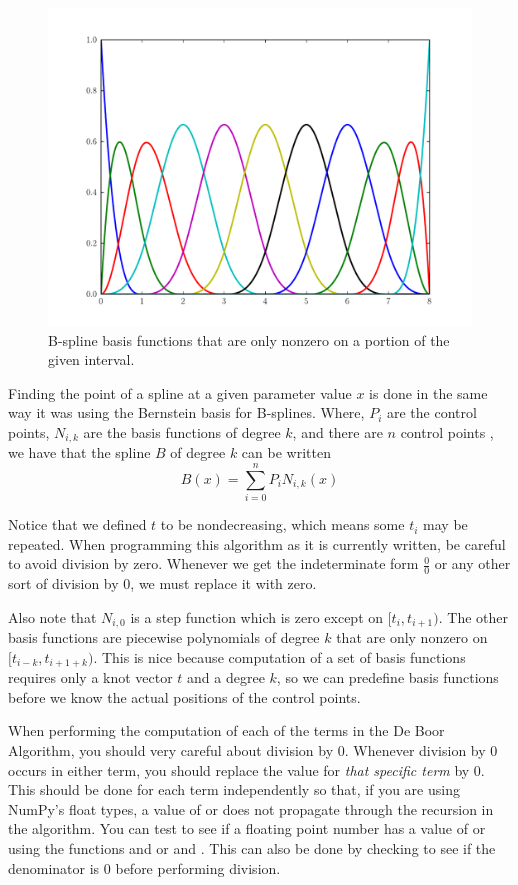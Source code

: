 \begin{figure}
\includegraphics[width=\textwidth]{bspline_basis.pdf}
\caption{B-spline basis functions that are only nonzero on a portion of the given interval.}
\label{fig:bspline_basis}
\end{figure}

Finding the point of a spline at a given parameter value $x$ is done in the same way it was using the Bernstein basis for B-splines.
Where, $P_i$ are the control points, $N_{i,k}$ are the basis functions of degree $k$, and there are $n$ control points , we have that the spline $B$ of degree $k$ can be written
\[B\left(x\right) = \sum_{i=0}^n P_i N_{i,k}\left(x\right)\]

Notice that we defined $t$ to be nondecreasing, which means some $t_i$ may be repeated.
When programming this algorithm as it is currently written, be careful to avoid division by zero.
Whenever we get the indeterminate form $\frac{0}{0}$ or any other sort of division by $0$, we must replace it with zero.

Also note that $N_{i,0}$ is a step function which is zero except on $[t_i, t_{i+1})$.
The other basis functions are piecewise polynomials of degree $k$ that are only nonzero on $[t_{i-k}, t_{i+1+k})$.
This is nice because computation of a set of basis functions requires only a knot vector $t$ and a degree $k$, so we can predefine basis functions before we know the actual positions of the control points.

\begin{warn}
When performing the computation of each of the terms in the De Boor Algorithm, you should very careful about division by $0$.
Whenever division by $0$ occurs in either term, you should replace the value for \emph{that specific term} by $0$.
This should be done for each term independently so that, if you are using NumPy's float types, a value of  or  does not propagate through the recursion in the algorithm.
You can test to see if a floating point number has a value of  or  using the functions  and  or  and .
This can also be done by checking to see if the denominator is $0$ before performing division.
\end{warn}

